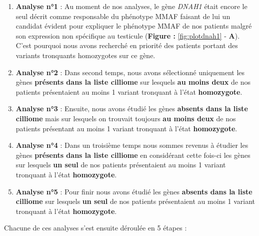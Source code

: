 \documentclass[12pt,twoside]{reedthesis}
\theoremstyle{definition}
\theoremstyle{definition}
\theoremstyle{remark}
\begin{document}
  \begin{enumerate}
  \def\labelenumi{\arabic{enumi}.}
  \item
    \textbf{Analyse n°1} : Au moment de nos analyses, le gène \emph{DNAH1}
    était encore le seul décrit comme responsable du phénotype MMAF
    faisant de lui un candidat évident pour expliquer le phénotype MMAF de
    nos patients malgré son expression non spécifique au testicule
    (\textbf{Figure : }\ref{fig:plotdnah1} - \textbf{A}). C'est pourquoi
    nous avons recherché en priorité des patients portant des variants
    tronquants homozygotes sur ce gène.
  \item
    \textbf{Analyse n°2} : Dans second temps, nous avons sélectionné
    uniquement les gènes \textbf{présents dans la liste cilliome} sur
    lesquels \textbf{au moins deux} de nos patients présentaient au moins
    1 variant tronquant à l'état \textbf{homozygote}.
  \item
    \textbf{Analyse n°3} : Ensuite, nous avons étudié les gènes
    \textbf{absents dans la liste cilliome} mais sur lesquels on trouvait
    toujours \textbf{au moins deux} de nos patients présentant au moins 1
    variant tronquant à l'état \textbf{homozygote}.
  \item
    \textbf{Analyse n°4} : Dans un troisième temps nous sommes revenus à
    étudier les gènes \textbf{présents dans la liste cilliome} en
    considérant cette fois-ci les gènes sur lesquels \textbf{un seul} de
    nos patients présentaient au moins 1 variant tronquant à l'état
    \textbf{homozygote}.
  \item
    \textbf{Analyse n°5} : Pour finir nous avons étudié les gènes
    \textbf{absents dans la liste cilliome} sur lesquels \textbf{un seul}
    de nos patients présentaient au moins 1 variant tronquant à l'état
    \textbf{homozygote}.
  \end{enumerate}
  
  Chacune de ces analyses s'est ensuite déroulée en 5 étapes :
  
\end{document}
